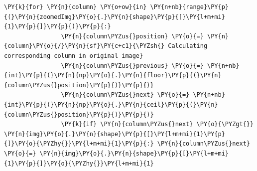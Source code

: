 \documentclass[a4paper,10pt]{article}%
\begin{document}
\begin{tcolorbox}[breakable, size=fbox, boxrule=1pt, pad at break*=1mm,colback=cellbackground, colframe=cellborder]
\begin{Verbatim}[commandchars=\\\{\}]
            \PY{k}{for} \PY{n}{column} \PY{o+ow}{in} \PY{n+nb}{range}\PY{p}{(}\PY{n}{zoomedImg}\PY{o}{.}\PY{n}{shape}\PY{p}{[}\PY{l+m+mi}{1}\PY{p}{]}\PY{p}{)}\PY{p}{:}
                \PY{n}{column\PYZus{}position} \PY{o}{=} \PY{n}{column}\PY{o}{/}\PY{n}{sf}\PY{c+c1}{\PYZsh{} Calculating corresponding column in original image}
                \PY{n}{column\PYZus{}previous} \PY{o}{=} \PY{n+nb}{int}\PY{p}{(}\PY{n}{np}\PY{o}{.}\PY{n}{floor}\PY{p}{(}\PY{n}{column\PYZus{}position}\PY{p}{)}\PY{p}{)}
                \PY{n}{column\PYZus{}next} \PY{o}{=} \PY{n+nb}{int}\PY{p}{(}\PY{n}{np}\PY{o}{.}\PY{n}{ceil}\PY{p}{(}\PY{n}{column\PYZus{}position}\PY{p}{)}\PY{p}{)}
                \PY{k}{if} \PY{n}{column\PYZus{}next} \PY{o}{\PYZgt{}} \PY{n}{img}\PY{o}{.}\PY{n}{shape}\PY{p}{[}\PY{l+m+mi}{1}\PY{p}{]}\PY{o}{\PYZhy{}}\PY{l+m+mi}{1}\PY{p}{:} \PY{n}{column\PYZus{}next} \PY{o}{=} \PY{n}{img}\PY{o}{.}\PY{n}{shape}\PY{p}{[}\PY{l+m+mi}{1}\PY{p}{]}\PY{o}{\PYZhy{}}\PY{l+m+mi}{1}


\end{Verbatim}
\end{tcolorbox}
\end{document}
